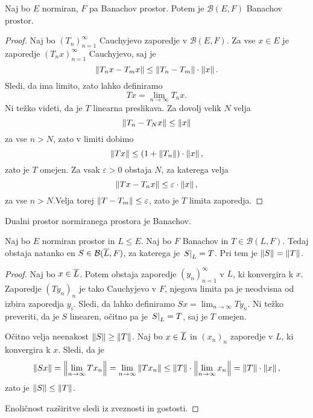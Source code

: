 \begin{izrek}
Naj bo $E$ normiran, $F$ pa Banachov prostor. Potem je
$\mathcal{B}(E,F)$ Banachov prostor.
\end{izrek}

\begin{proof}
Naj bo $(T_n)_{n=1}^\infty$ Cauchyjevo zaporedje v
$\mathcal{B}(E,F)$. Za vse $x \in E$ je zaporedje
$(T_n x)_{n=1}^\infty$ Cauchyjevo, saj je
\[
\left\lVert T_n x - T_m x\right\rVert \leq \left\lVert T_n - T_m\right\rVert \cdot \left\lVert x\right\rVert.
\]
Sledi, da ima limito, zato lahko definiramo
\[
Tx = \lim_{n \to \infty} T_n x.
\]
Ni težko videti, da je $T$ linearna preslikava. Za dovolj velik $N$
velja
\[
\left\lVert T_n - T_N x\right\rVert \leq \left\lVert x\right\rVert
\]
za vse $n > N$, zato v limiti dobimo
\[
\left\lVert Tx\right\rVert \leq (1 + \left\lVert T_n\right\rVert) \cdot \left\lVert x\right\rVert,
\]
zato je $T$ omejen. Za vsak $\varepsilon > 0$ obstaja $N$, za
katerega velja
\[
\left\lVert Tx - T_n x\right\rVert \leq \varepsilon \cdot \left\lVert x\right\rVert,
\]
za vse $n > N$.Velja torej $\left\lVert T - T_m\right\rVert \leq \varepsilon$, zato
je $T$ limita zaporedja.
\end{proof}

\begin{posledica}
Dualni prostor normiranega prostora je Banachov.
\end{posledica}

\begin{posledica}
Naj bo $E$ normiran prostor in $L \leq E$. Naj bo $F$ Banachov in
$T \in \mathcal{B}(L,F)$. Tedaj obstaja natanko en
$S \in \mathcal{B}(\overline{L},F)$, za katerega je
$\left. S\right|_{L}^{} = T$. Pri tem je $\left\lVert S\right\rVert = \left\lVert T\right\rVert$.
\end{posledica}

\begin{proof}
Naj bo $x \in \overline{L}$. Potem obstaja zaporedje
$(y_n)_{n=1}^\infty$ v $L$, ki konvergira k $x$. Zaporedje
$(Ty_n)_n$ je tako Cauchyjevo v $F$, njegova limita pa je neodvisna
od izbira zaporedja $y_i$. Sledi, da lahko definiramo
$Sx = \lim_{n \to \infty} T y_n$. Ni težko preveriti, da je $S$
linearen, očitno pa je $\left. S\right|_{L}^{} = T$, saj je $T$ omejen.

Očitno velja neenakost $\left\lVert S\right\rVert \geq \left\lVert T\right\rVert$. Naj bo
$x \in \overline{L}$ in $(x_n)_n$ zaporedje v $L$, ki konvergira k
$x$. Sledi, da je
\[
\left\lVert Sx\right\rVert =
\left\lVert \lim_{n \to \infty} Tx_n\right\rVert =
\lim_{n \to \infty} \left\lVert Tx_n\right\rVert \leq
\left\lVert T\right\rVert \cdot \left\lVert \lim_{n \to \infty} x_n\right\rVert =
\left\lVert T\right\rVert \cdot \left\lVert x\right\rVert,
\]
zato je $\left\lVert S\right\rVert \leq \left\lVert T\right\rVert$.

Enoličnost razširitve sledi iz zveznosti in gostosti.
\end{proof}

